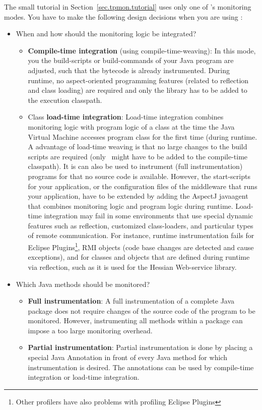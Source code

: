 \documentclass[a4paper,12pt]{scrartcl}
\begin{document}
The small tutorial in Section~\ref{sec.tpmon.tutorial} uses only one of \tpmon's monitoring modes. You have to make the following design decisions when you are using \tpmon:
\begin{itemize}
 \item When and how should the monitoring logic be integrated?
\begin{itemize}
 \item \textbf{Compile-time integration} (using compile-time-weaving): In this mode, you the build-scripts or build-commands of your Java program are adjusted, such that the bytecode is already instrumented. During runtime, no aspect-oriented programming features (related to reflection and class loading) are required and only the \tpmon library has to be added to the execution classpath.
\item Class \textbf{load-time integration}: Load-time integration combines monitoring logic with program logic of a class at the time the Java Virtual Machine accesses program class for the first time (during runtime. A advantage of load-time weaving is that no large changes to the build scripts are required (only \tpmon\ might have to be added to the compile-time classpath). It is can also be used to instrument (full instrumentation) programs for that no source code is available. However, the start-scripts for your application, or the configuration files of the middleware that runs your application, have to be extended by adding the AspectJ javaagent that combines monitoring logic and program logic during runtime. Load-time integration may fail in some environments that use special dynamic features such as reflection, customized class-loaders, and particular types of remote communication. For instance, runtime instrumentation fails for Eclipse Plugins\footnote{Other profilers have also problems with profiling Eclipse Plugins}, RMI objects (code base changes are detected and cause exceptions), and for classes and objects that are defined during runtime via reflection, such as it is used for the Hessian Web-service library.
\end{itemize}
\item Which Java methods should be monitored?
\begin{itemize}
\item \textbf{Full instrumentation}: A full instrumentation of a complete Java package does not require changes of the source code of the program to be monitored. However, instrumenting all methods within a package can impose a too large monitoring overhead.
\item \textbf{Partial instrumentation}: Partial instrumentation is done by placing a special Java Annotation in front of every Java method for which instrumentation is desired. The annotations can be used by compile-time integration or load-time integration.

\end{itemize}
\end{itemize}
\end{document}

